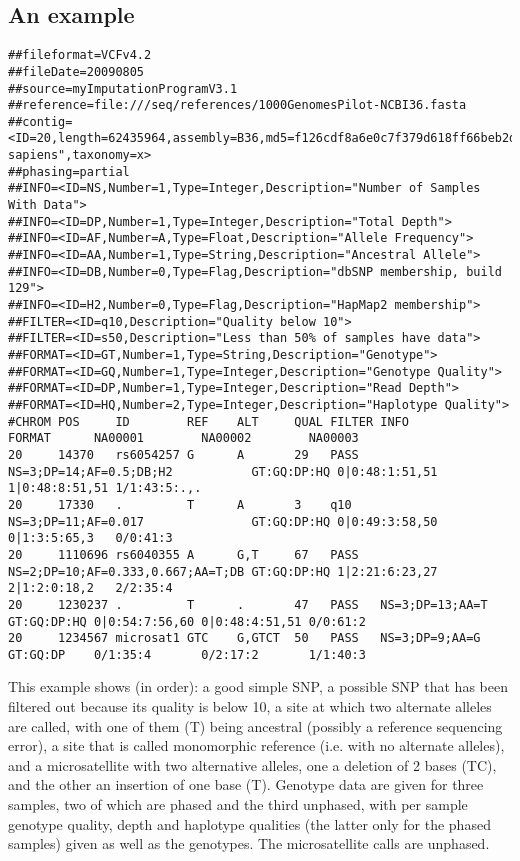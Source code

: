 \documentclass[8pt]{article}
\begin{document}
\subsection{An example}
\scriptsize
\begin{verbatim}
##fileformat=VCFv4.2
##fileDate=20090805
##source=myImputationProgramV3.1
##reference=file:///seq/references/1000GenomesPilot-NCBI36.fasta
##contig=<ID=20,length=62435964,assembly=B36,md5=f126cdf8a6e0c7f379d618ff66beb2da,species="Homo sapiens",taxonomy=x>
##phasing=partial
##INFO=<ID=NS,Number=1,Type=Integer,Description="Number of Samples With Data">
##INFO=<ID=DP,Number=1,Type=Integer,Description="Total Depth">
##INFO=<ID=AF,Number=A,Type=Float,Description="Allele Frequency">
##INFO=<ID=AA,Number=1,Type=String,Description="Ancestral Allele">
##INFO=<ID=DB,Number=0,Type=Flag,Description="dbSNP membership, build 129">
##INFO=<ID=H2,Number=0,Type=Flag,Description="HapMap2 membership">
##FILTER=<ID=q10,Description="Quality below 10">
##FILTER=<ID=s50,Description="Less than 50% of samples have data">
##FORMAT=<ID=GT,Number=1,Type=String,Description="Genotype">
##FORMAT=<ID=GQ,Number=1,Type=Integer,Description="Genotype Quality">
##FORMAT=<ID=DP,Number=1,Type=Integer,Description="Read Depth">
##FORMAT=<ID=HQ,Number=2,Type=Integer,Description="Haplotype Quality">
#CHROM POS     ID        REF    ALT     QUAL FILTER INFO                              FORMAT      NA00001        NA00002        NA00003
20     14370   rs6054257 G      A       29   PASS   NS=3;DP=14;AF=0.5;DB;H2           GT:GQ:DP:HQ 0|0:48:1:51,51 1|0:48:8:51,51 1/1:43:5:.,.
20     17330   .         T      A       3    q10    NS=3;DP=11;AF=0.017               GT:GQ:DP:HQ 0|0:49:3:58,50 0|1:3:5:65,3   0/0:41:3
20     1110696 rs6040355 A      G,T     67   PASS   NS=2;DP=10;AF=0.333,0.667;AA=T;DB GT:GQ:DP:HQ 1|2:21:6:23,27 2|1:2:0:18,2   2/2:35:4
20     1230237 .         T      .       47   PASS   NS=3;DP=13;AA=T                   GT:GQ:DP:HQ 0|0:54:7:56,60 0|0:48:4:51,51 0/0:61:2
20     1234567 microsat1 GTC    G,GTCT  50   PASS   NS=3;DP=9;AA=G                    GT:GQ:DP    0/1:35:4       0/2:17:2       1/1:40:3
\end{verbatim}
\normalsize
This example shows (in order): a good simple SNP, a possible SNP that has been filtered out because its quality is below 10, a site at which two alternate alleles are called, with one of them (T) being ancestral (possibly a reference sequencing error), a site that is called monomorphic reference (i.e. with no alternate alleles), and a microsatellite with two alternative alleles, one a deletion of 2 bases (TC), and the other an insertion of one base (T). Genotype data are given for three samples, two of which are phased and the third unphased, with per sample genotype quality, depth and haplotype qualities (the latter only for the phased samples) given as well as the genotypes. The microsatellite calls are unphased.
\end{document}
